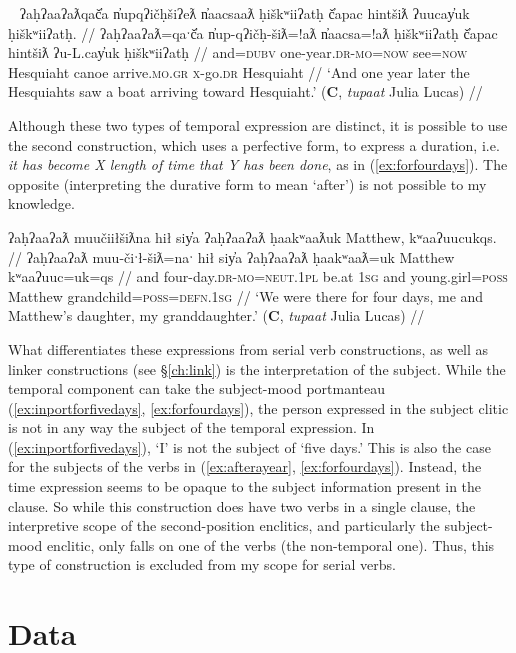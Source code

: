 \ex~ \label{ex:afterayear}
\begingl
\glpreamble ʔaḥʔaaʔaƛqač̓a n̓upqʔičḥšiʔeƛ n̓aacsaaƛ ḥiškʷiiʔatḥ č̓apac hintšiƛ ʔuucay̓uk ḥiškʷiiʔatḥ. //
\gla ʔaḥʔaaʔaƛ=qaˑč̓a n̓up-qʔičḥ-šiƛ=!aƛ n̓aacsa=!aƛ ḥiškʷiiʔatḥ č̓apac hintšiƛ ʔu-L.cay̓uk ḥiškʷiiʔatḥ //
\glb and=\textsc{dubv} one-year.\textsc{dr}-\textsc{mo}=\textsc{now} see=\textsc{now} Hesquiaht canoe arrive.\textsc{mo}.\textsc{gr} \textsc{x}-go.\textsc{dr} Hesquiaht //
\glft `And one year later the Hesquiahts saw a boat arriving toward Hesquiaht.' (\textbf{C}, \textit{tupaat} Julia Lucas) //
\endgl
\xe

Although these two types of temporal expression are distinct, it is possible to use the second construction, which uses a perfective form, to express a duration, i.e. \textit{it has become X length of time that Y has been done}, as in (\ref{ex:forfourdays}). The opposite (interpreting the durative form to mean `after') is not possible to my knowledge.

\ex \label{ex:forfourdays}
\begingl
\glpreamble ʔaḥʔaaʔaƛ muučiiłšiƛna hił siy̓a ʔaḥʔaaʔaƛ ḥaakʷaaƛuk Matthew, kʷaaʔuucukqs. //
\gla ʔaḥʔaaʔaƛ muu-čiˑł-šiƛ=naˑ hił siy̓a ʔaḥʔaaʔaƛ ḥaakʷaaƛ=uk Matthew kʷaaʔuuc=uk=qs //
\glb and four-day.\textsc{dr}-\textsc{mo}=\textsc{neut.1pl} be.at \textsc{1sg} and young.girl=\textsc{poss} Matthew grandchild=\textsc{poss}=\textsc{defn.1sg} //
\glft `We were there for four days, me and Matthew's daughter, my granddaughter.' (\textbf{C}, \textit{tupaat} Julia Lucas) //
\endgl
\xe

What differentiates these expressions from serial verb constructions, as well as linker constructions (see \S\ref{ch:link}) is the interpretation of the subject. While the temporal component can take the subject-mood portmanteau (\ref{ex:inportforfivedays}, \ref{ex:forfourdays}), the person expressed in the subject clitic is not in any way the subject of the temporal expression. In (\ref{ex:inportforfivedays}), `I' is not the subject of `five days.' This is also the case for the subjects of the verbs in (\ref{ex:afterayear}, \ref{ex:forfourdays}). Instead, the time expression seems to be opaque to the subject information present in the clause. So while this construction does have two verbs in a single clause, the interpretive scope of the second-position enclitics, and particularly the subject-mood enclitic, only falls on one of the verbs (the non-temporal one). Thus, this type of construction is excluded from my scope for serial verbs.

\section{Data} \label{ch:sv:data}

